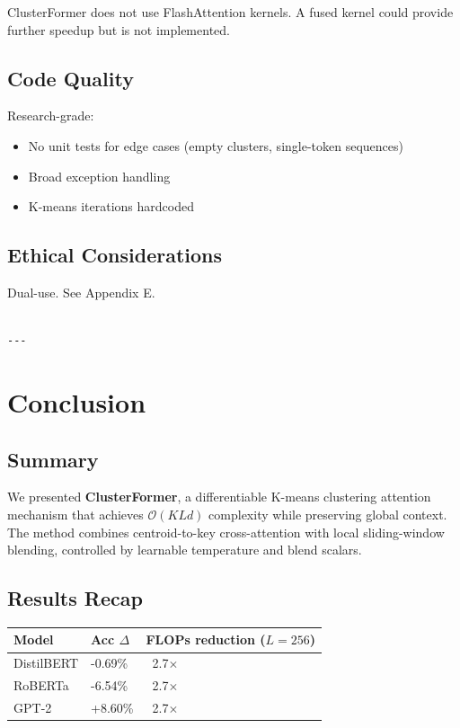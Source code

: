 ClusterFormer does not use FlashAttention kernels. A fused kernel could 
provide further speedup but is not implemented.

\subsection{Code Quality}

Research-grade:
\begin{itemize}
\item No unit tests for edge cases (empty clusters, single-token sequences)
\item Broad exception handling
\item K-means iterations hardcoded

\end{itemize}
\subsection{Ethical Considerations}

Dual-use. See Appendix E.
\begin{lstlisting}

---
\end{lstlisting}

\section{Conclusion}

\subsection{Summary}

We presented \textbf{ClusterFormer}, a differentiable K-means clustering 
attention mechanism that achieves $\mathcal{O}(KLd)$ complexity while 
preserving global context. The method combines centroid-to-key 
cross-attention with local sliding-window blending, controlled by learnable 
temperature and blend scalars.

\subsection{Results Recap}

\begin{table}[H]
\centering
\small
\begin{tabular}{lll}
\toprule
\textbf{Model} & \textbf{Acc $\Delta$} & \textbf{FLOPs reduction ($L=256$)} \\
\midrule
DistilBERT & -0.69\% & ~2.7$\times$ \\
RoBERTa & -6.54\% & ~2.7$\times$ \\
GPT-2 & +8.60\% & ~2.7$\times$ \\
\bottomrule
\end{tabular}
\end{table}

